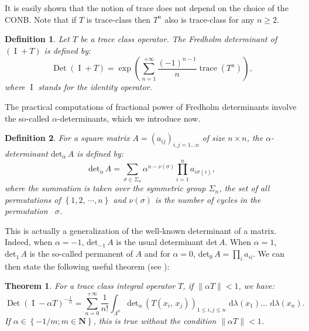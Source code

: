 \documentclass[11pt,a4paper]{amsart}
\newtheorem{Theorem}{Theorem}
\newtheorem{Definition}{Definition}
\begin{document}
It is easily shown that the notion of trace does not depend on the
choice of the CONB. Note that if $T$ is trace-class then $T^n$ also is
trace-class for any $n\ge 2.$
\begin{Definition}
  \label{def:fredholm_determinant}
  Let $T$ be a trace class operator. The Fredholm determinant of
  $({\operatorname{I}}+T)$ is defined by:
  \begin{equation*}
    {\operatorname{Det}}({\operatorname{I}}+T)=\exp\left(\sum_{n=1}^{+\infty}\frac{(-1)^{n-1}}{n}{\operatorname{trace}} (T^n)\right),
  \end{equation*}
  where ${\operatorname{I}}$ stands for the identity operator.
\end{Definition}
The practical computations of fractional power of Fredholm
determinants involve the so-called $\alpha$-determinants, which we
introduce now.
\begin{Definition}
  For a square matrix $A=\left( a_{ij}\right)_{i,j=1\ldots n} $ of
  size $n \times n$, the $\alpha$-determinant ${{\text{det}}}_{\alpha}\, A$ is
  defined by:
  \begin{equation*}
    {{\text{det}}}_{\alpha}\, A=\sum_{\sigma\in\Sigma_n}\alpha^{n-\nu\left(
        \sigma\right) }\prod_{i=1}^{n}a_{i\sigma\left( i\right) },
  \end{equation*}
  where the summation is taken over the symmetric group $\Sigma_n$,
  the set of all permutations of $\left\lbrace 1, 2,\, \cdots, n
  \right\rbrace$ and $\nu(\sigma)$ is the number of cycles in the
  permutation ~$\sigma$.
\end{Definition}
This is actually a generalization of the well-known determinant of a
matrix. Indeed, when $\alpha=-1$, ${{\text{det}}}_{-1}\, A$ is the usual
determinant ${{\text{det}}}\, A.$ When $\alpha=1$, ${{\text{det}}}_{1} \, A$ is the
so-called permanent of $A$ and for $\alpha=0$, ${{\text{det}}}_{0}\, A=\prod_{i}
a_{ii}$.  We can then state the following useful theorem (see
\cite{MR2018415}):
\begin{Theorem}
  \label{thm:developpement_det_alpha}
  For a trace class integral operator $T$, if $\parallel \alpha T
  \parallel < 1 $, we have:
  \begin{equation*}
    {\operatorname{Det}} ({\operatorname{I}}-\alpha T)^{-\frac{1}{\alpha}}=
    \sum_{n=0}^{+\infty}\frac{1}{n!}\int_{\Lambda^n}{{{\text{det}}}_{\alpha}\, (T(x_i,\, x_j))_{1\le i,j\le n}}{\text{ d}}\lambda(x_1)\ldots{\text{ d}}\lambda(x_n).
  \end{equation*}
  If $\alpha \in \left\lbrace -1/m; m \in {{\mathbf N}} \right\rbrace $, this is
  true without the condition $\parallel \alpha T \parallel < 1 $.
\end{Theorem}
\end{document}
